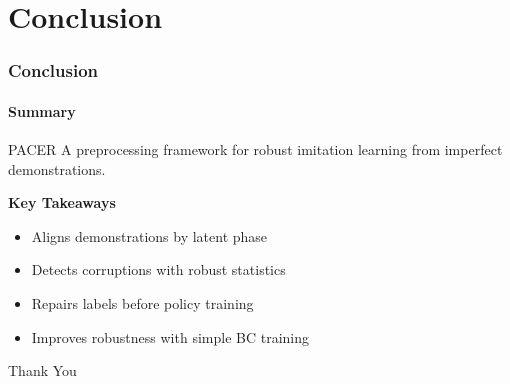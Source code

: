\section{Conclusion}

\begin{frame}
    \frametitle{\textbf{Conclusion}}
    \framesubtitle{Summary}

    \begin{block}{PACER}
        A preprocessing framework for robust imitation learning from imperfect demonstrations.
    \end{block}

    \vspace{0.7em}

    \textbf{Key Takeaways}
    \begin{itemize}
        \item Aligns demonstrations by latent phase
        \item Detects corruptions with robust statistics
        \item Repairs labels before policy training
        \item Improves robustness with simple BC training
    \end{itemize}

    \vspace{1em}

    \begin{center}
        \Large Thank You
    \end{center}

\end{frame}
